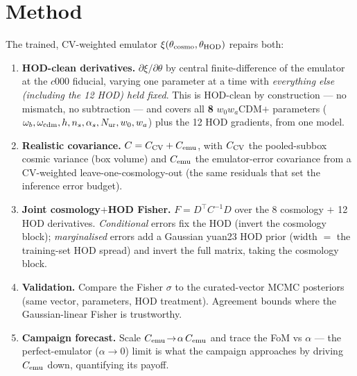 \documentclass[11pt]{article}
\begin{document}
\section{Method}
The trained, CV-weighted emulator $\xi(\theta_{\rm cosmo},\theta_{\rm HOD})$ repairs both:
\begin{enumerate}
\item \textbf{HOD-clean derivatives.} $\partial\xi/\partial\theta$ by central
  finite-difference of the emulator at the $c000$ fiducial, varying one parameter at a
  time with \emph{everything else (including the 12 HOD) held fixed}. This is HOD-clean
  by construction --- no mismatch, no subtraction --- and covers all \textbf{8}
  $w_0w_a$CDM$+$ parameters ($\omega_b,\omega_{\rm cdm},h,n_s,\alpha_s,N_{\rm ur},w_0,
  w_a$) plus the 12 HOD gradients, from one model.
\item \textbf{Realistic covariance.} $C=C_{\rm CV}+C_{\rm emu}$, with $C_{\rm CV}$ the
  pooled-subbox cosmic variance (box volume) and $C_{\rm emu}$ the emulator-error
  covariance from a CV-weighted leave-one-cosmology-out (the same residuals that set the
  inference error budget).
\item \textbf{Joint cosmology$+$HOD Fisher.} $F=D^{\!\top}C^{-1}D$ over the 8 cosmology
  $+$ 12 HOD derivatives. \emph{Conditional} errors fix the HOD (invert the cosmology
  block); \emph{marginalised} errors add a Gaussian yuan23 HOD prior (width $=$ the
  training-set HOD spread) and invert the full matrix, taking the cosmology block.
\item \textbf{Validation.} Compare the Fisher $\sigma$ to the curated-vector MCMC
  posteriors (same vector, parameters, HOD treatment). Agreement bounds where the
  Gaussian-linear Fisher is trustworthy.
\item \textbf{Campaign forecast.} Scale $C_{\rm emu}\!\to\!\alpha\,C_{\rm emu}$ and trace
  the FoM vs $\alpha$ --- the perfect-emulator ($\alpha\!\to\!0$) limit is what the
  campaign approaches by driving $C_{\rm emu}$ down, quantifying its payoff.
\end{enumerate}
\end{document}
